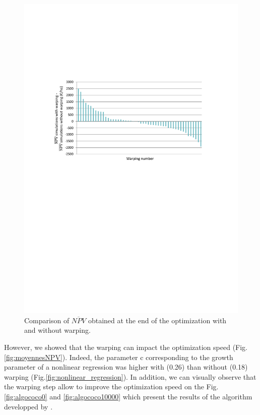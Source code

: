 \begin{figure}[!ht]
	\centering
	\includegraphics[trim = 2.6cm 13.5cm 3.1cm 6.8cm, clip, width=\textwidth]{Figures_Warping_resultats_warping_moins_sanswarping.pdf}
	\caption{Comparison of $\overline{NPV}$ obtained at the end of the optimization with and without warping. }\label{fig:waping_moins_sanswarping}
\end{figure}

However, we showed that the warping can impact the optimization speed (Fig.\ref{fig:moyennesNPV}). 
Indeed, the parameter c corresponding to the growth parameter of a nonlinear regression was higher with (0.26) than without (0.18) warping (Fig.\ref{fig:nonlinear_regression}). 
In addition, we can visually observe that the warping step allow to improve the optimization speed on the Fig.\ref{fig:algococo0} and \ref{fig:algococo10000} 
which present the results of the algorithm developped by .

